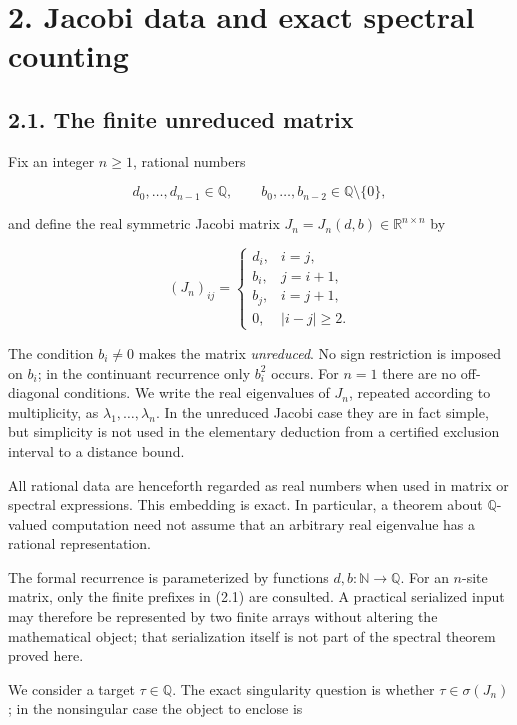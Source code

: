 \documentclass[
  11pt,
]{article}
\begin{document}
\section{2. Jacobi data and exact spectral
counting}\label{jacobi-data-and-exact-spectral-counting}

\subsection{2.1. The finite unreduced
matrix}\label{the-finite-unreduced-matrix}

Fix an integer \(n\ge1\), rational numbers

\[
d_0,\ldots,d_{n-1}\in\mathbb Q,
\qquad b_0,\ldots,b_{n-2}\in\mathbb Q\setminus\{0\},
\tag{2.1}
\]

and define the real symmetric Jacobi matrix
\(J_n=J_n(d,b)\in\mathbb R^{n\times n}\) by

\[
(J_n)_{ij}=
\begin{cases}
 d_i,&i=j,\\
 b_i,&j=i+1,\\
 b_j,&i=j+1,\\
 0,&|i-j|\ge2.
\end{cases}
\tag{2.2}
\]

The condition \(b_i\ne0\) makes the matrix \emph{unreduced}. No sign
restriction is imposed on \(b_i\); in the continuant recurrence only
\(b_i^2\) occurs. For \(n=1\) there are no off-diagonal conditions. We
write the real eigenvalues of \(J_n\), repeated according to
multiplicity, as \(\lambda_1,\ldots,\lambda_n\). In the unreduced Jacobi
case they are in fact simple, but simplicity is not used in the
elementary deduction from a certified exclusion interval to a distance
bound.

All rational data are henceforth regarded as real numbers when used in
matrix or spectral expressions. This embedding is exact. In particular,
a theorem about \(\mathbb Q\)-valued computation need not assume that an
arbitrary real eigenvalue has a rational representation.

The formal recurrence is parameterized by functions
\(d,b:\mathbb N\to\mathbb Q\). For an \(n\)-site matrix, only the finite
prefixes in (2.1) are consulted. A practical serialized input may
therefore be represented by two finite arrays without altering the
mathematical object; that serialization itself is not part of the
spectral theorem proved here.

We consider a target \(\tau\in\mathbb Q\). The exact singularity
question is whether \(\tau\in\sigma(J_n)\); in the nonsingular case the
object to enclose is
\end{document}
